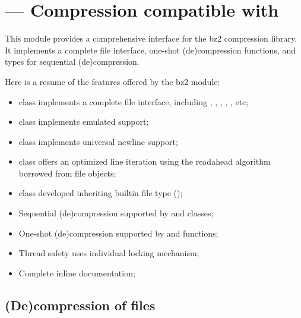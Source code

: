 \section{ ---
         Compression compatible with }



This module provides a comprehensive interface for the bz2 compression library.
It implements a complete file interface, one-shot (de)compression functions,
and types for sequential (de)compression.

Here is a resume of the features offered by the bz2 module:

\begin{itemize}
\item {} class implements a complete file interface, including
      , , ,
      , , etc;
\item {} class implements emulated  support;
\item {} class implements universal newline support;
\item {} class offers an optimized line iteration using
      the readahead algorithm borrowed from file objects;
\item {} class developed inheriting builtin file type
      ();
\item Sequential (de)compression supported by  and
       classes;
\item One-shot (de)compression supported by  and
       functions;
\item Thread safety uses individual locking mechanism;
\item Complete inline documentation;
\end{itemize}


\subsection{(De)compression of files}

